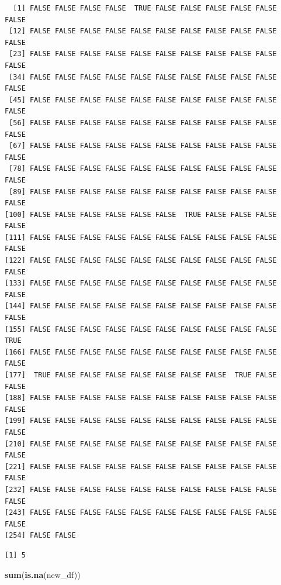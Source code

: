 \documentclass[]{book}
\newenvironment{Shaded}{\begin{snugshade}}{\end{snugshade}}
\newcommand{\KeywordTok}[1]{\textcolor[rgb]{0.13,0.29,0.53}{\textbf{#1}}}
\newcommand{\OperatorTok}[1]{\textcolor[rgb]{0.81,0.36,0.00}{\textbf{#1}}}
\newcommand{\NormalTok}[1]{#1}
\theoremstyle{definition}
\theoremstyle{definition}
\theoremstyle{definition}
\theoremstyle{remark}
\begin{document}
\begin{verbatim}
  [1] FALSE FALSE FALSE FALSE  TRUE FALSE FALSE FALSE FALSE FALSE FALSE
 [12] FALSE FALSE FALSE FALSE FALSE FALSE FALSE FALSE FALSE FALSE FALSE
 [23] FALSE FALSE FALSE FALSE FALSE FALSE FALSE FALSE FALSE FALSE FALSE
 [34] FALSE FALSE FALSE FALSE FALSE FALSE FALSE FALSE FALSE FALSE FALSE
 [45] FALSE FALSE FALSE FALSE FALSE FALSE FALSE FALSE FALSE FALSE FALSE
 [56] FALSE FALSE FALSE FALSE FALSE FALSE FALSE FALSE FALSE FALSE FALSE
 [67] FALSE FALSE FALSE FALSE FALSE FALSE FALSE FALSE FALSE FALSE FALSE
 [78] FALSE FALSE FALSE FALSE FALSE FALSE FALSE FALSE FALSE FALSE FALSE
 [89] FALSE FALSE FALSE FALSE FALSE FALSE FALSE FALSE FALSE FALSE FALSE
[100] FALSE FALSE FALSE FALSE FALSE FALSE  TRUE FALSE FALSE FALSE FALSE
[111] FALSE FALSE FALSE FALSE FALSE FALSE FALSE FALSE FALSE FALSE FALSE
[122] FALSE FALSE FALSE FALSE FALSE FALSE FALSE FALSE FALSE FALSE FALSE
[133] FALSE FALSE FALSE FALSE FALSE FALSE FALSE FALSE FALSE FALSE FALSE
[144] FALSE FALSE FALSE FALSE FALSE FALSE FALSE FALSE FALSE FALSE FALSE
[155] FALSE FALSE FALSE FALSE FALSE FALSE FALSE FALSE FALSE FALSE  TRUE
[166] FALSE FALSE FALSE FALSE FALSE FALSE FALSE FALSE FALSE FALSE FALSE
[177]  TRUE FALSE FALSE FALSE FALSE FALSE FALSE FALSE  TRUE FALSE FALSE
[188] FALSE FALSE FALSE FALSE FALSE FALSE FALSE FALSE FALSE FALSE FALSE
[199] FALSE FALSE FALSE FALSE FALSE FALSE FALSE FALSE FALSE FALSE FALSE
[210] FALSE FALSE FALSE FALSE FALSE FALSE FALSE FALSE FALSE FALSE FALSE
[221] FALSE FALSE FALSE FALSE FALSE FALSE FALSE FALSE FALSE FALSE FALSE
[232] FALSE FALSE FALSE FALSE FALSE FALSE FALSE FALSE FALSE FALSE FALSE
[243] FALSE FALSE FALSE FALSE FALSE FALSE FALSE FALSE FALSE FALSE FALSE
[254] FALSE FALSE
\end{verbatim}

\begin{Shaded}
\end{Shaded}

\begin{verbatim}
[1] 5
\end{verbatim}

\begin{Shaded}
\begin{Highlighting}[]
\KeywordTok{sum}\NormalTok{(}\KeywordTok{is.na}\NormalTok{(new_df))}
\end{Highlighting}
\end{Shaded}
\end{document}

